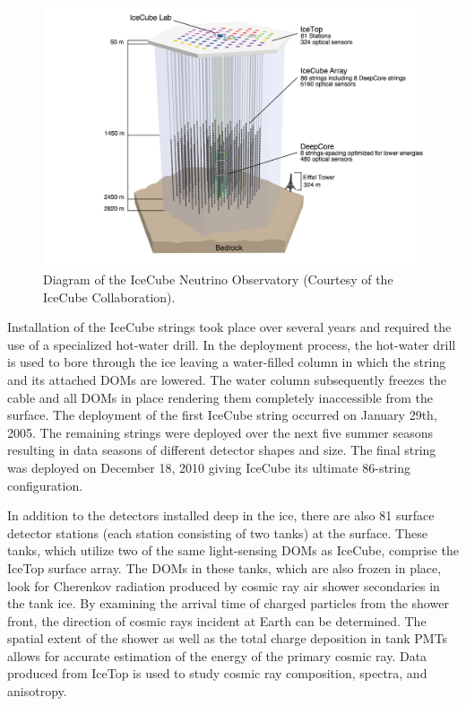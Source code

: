 \documentclass{gatech-thesis}
\begin{document}
\begin{figure}[ht]
  \begin{center}
    \includegraphics[width=1.0\textwidth,keepaspectratio]{ArrayWSeasonsLabels.pdf}
  \end{center}
  \caption{Diagram of the IceCube Neutrino Observatory (Courtesy of the IceCube Collaboration).}
  \label{fig:icecube}
\end{figure}

Installation of the IceCube strings took place over several years and required the use of a specialized hot-water drill. In the deployment process, the hot-water drill is used to bore through the ice leaving a water-filled column in which the string and its attached DOMs are lowered. The water column subsequently freezes the cable and all DOMs in place rendering them completely inaccessible from the surface. The deployment of the first IceCube string occurred on January 29th, 2005. The remaining strings were deployed over the next five summer seasons resulting in data seasons of different detector shapes and size. The final string was deployed on December 18, 2010 giving IceCube its ultimate 86-string configuration.


In addition to the detectors installed deep in the ice, there are also 81 surface detector stations (each station consisting of two tanks) at the surface. These tanks, which utilize two of the same light-sensing DOMs as IceCube, comprise the IceTop surface array. The DOMs in these tanks, which are also frozen in place, look for Cherenkov radiation produced by cosmic ray air shower secondaries in the tank ice. By examining the arrival time of charged particles from the shower front, the direction of cosmic rays incident at Earth can be determined. The spatial extent of the shower as well as the total charge deposition in tank PMTs allows for accurate estimation of the energy of the primary cosmic ray. Data produced from IceTop is used to study cosmic ray composition, spectra, and anisotropy.
\end{document}
